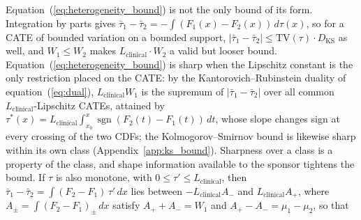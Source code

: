\documentclass[AMA,Times1COL]{WileyNJDv5}
\begin{document}
\noindent Equation~(\ref{eq:heterogeneity_bound}) is not the only bound of its form. Integration by parts gives $\bar{\tau}_1 - \bar{\tau}_2 = -\int (F_1(x) - F_2(x)) \, d\tau(x)$, so for a CATE of bounded variation on a bounded support, $|\bar{\tau}_1 - \bar{\tau}_2| \leq \mathrm{TV}(\tau) \cdot D_{\text{KS}}$ as well, and $W_1 \leq W_2$ makes $L_{\text{clinical}} \cdot W_2$ a valid but looser bound.\cite{villani2009} Equation~(\ref{eq:heterogeneity_bound}) is sharp when the Lipschitz constant is the only restriction placed on the CATE: by the Kantorovich--Rubinstein duality of equation~(\ref{eq:dual}), $L_{\text{clinical}} W_1$ is the supremum of $|\bar{\tau}_1 - \bar{\tau}_2|$ over all common $L_{\text{clinical}}$-Lipschitz CATEs, attained by $\tau^*(x) = L_{\text{clinical}} \int_{x_0}^{x} \operatorname{sgn}(F_2(t) - F_1(t))\,dt$, whose slope changes sign at every crossing of the two CDFs; the Kolmogorov--Smirnov bound is likewise sharp within its own class (Appendix~\ref{app:ks_bound}). Sharpness over a class is a property of the class, and shape information available to the sponsor tightens the bound. If $\tau$ is also monotone, with $0 \leq \tau' \leq L_{\text{clinical}}$, then $\bar{\tau}_1 - \bar{\tau}_2 = \int (F_2 - F_1)\,\tau'\,dx$ lies between $-L_{\text{clinical}} A_-$ and $L_{\text{clinical}} A_+$, where $A_\pm = \int (F_2 - F_1)_\pm\,dx$ satisfy $A_+ + A_- = W_1$ and $A_+ - A_- = \mu_1 - \mu_2$, so that
\end{document}
